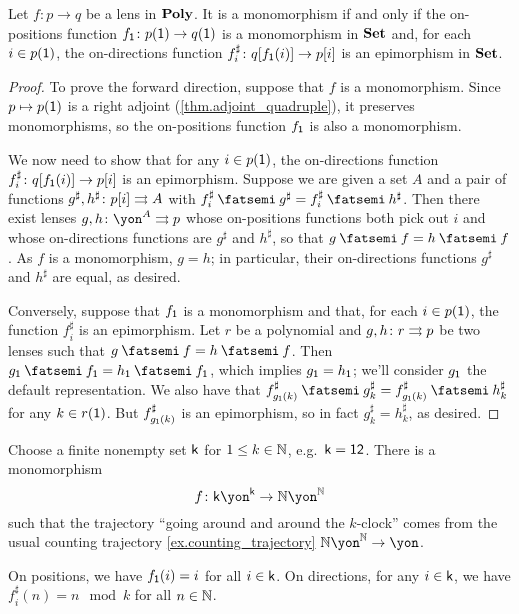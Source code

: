 \documentclass[Book-Poly]{subfiles}
\begin{document}
\begin{proposition}\label{prop.monics_in_poly}
Let $f \colon p \to q$ be a lens in $\mathbf{Poly}$. It is a monomorphism if and only if the on-positions function $f_{\textsf{1}} \colon p(\textsf{1}) \to q(\textsf{1})$ is a monomorphism in $\mathbf{Set}$ and, for each $i \in p(\textsf{1})$, the on-directions function $f^\sharp_i \colon q[f_{\textsf{1}}(i)]\to p[i]$ is an epimorphism in $\mathbf{Set}$.
\end{proposition}
\begin{proof}
To prove the forward direction, suppose that $f$ is a monomorphism.
Since $p\mapsto p(\textsf{1})$ is a right adjoint (\cref{thm.adjoint_quadruple}), it preserves monomorphisms, so the on-positions function $f_{\textsf{1}}$ is also a monomorphism.

We now need to show that for any $i\in p(\textsf{1})$, the on-directions function $f^\sharp_i \colon q[f_{\textsf{1}}(i)] \to p[i]$ is an epimorphism.
Suppose we are given a set $A$ and a pair of functions $g^\sharp,h^\sharp\colon p[i]\rightrightarrows A$ with $f^\sharp_i \then g^\sharp = f^\sharp_i \then h^\sharp$.
Then there exist lenses $g,h \colon \yon^A \tto p$ whose on-positions functions both pick out $i$ and whose on-directions functions are $g^\sharp$ and $h^\sharp$, so that $g \then f = h \then f$.
As $f$ is a monomorphism, $g = h$; in particular, their on-directions functions $g^\sharp$ and $h^\sharp$ are equal, as desired.

Conversely, suppose that $f_{\textsf{1}}$ is a monomorphism and that, for each $i\in p(\textsf{1})$, the function $f^\sharp_i$ is an epimorphism.
Let $r$ be a polynomial and $g,h\colon r\rightrightarrows p$ be two lenses such that $g \then f = h \then f$.
Then $g_\1 \then f_\1 = h_\1 \then f_\1$, which implies $g_{\textsf{1}} = h_{\textsf{1}}$; we'll consider $g_{\textsf{1}}$ the default representation.
We also have that $f^\sharp_{g_\1(k)} \then g^\sharp_k = f^\sharp_{g_\1(k)} \then h^\sharp_k$ for any $k \in r(\textsf{1})$. But $f^\sharp_{g_{\textsf{1}}(k)}$ is an epimorphism, so in fact $g^\sharp_k = h^\sharp_k$, as desired.
\end{proof}

\begin{example}\label{ex.clock_in_N}
Choose a finite nonempty set $\mathsf{k}$ for $1\leq k\in\mathbb{N}$, e.g.\ $\mathsf{k}=\textsf{1}\textsf{2}$. There is a monomorphism
\[
f \colon\ord{k}\yon^{\ord{k}}\to\nn\yon^\nn
\]
such that the trajectory ``going around and around the $k$-clock'' comes from the usual counting trajectory \cref{ex.counting_trajectory} $\nn\yon^\nn\to\yon$.

On positions, we have $f_{\textsf{1}}(i)=i$ for all $i \in \mathsf{k}$. On directions, for any $i \in \mathsf{k}$, we have $f^\sharp_i(n) = n \mod k$ for all $n \in \mathbb{N}$.
\end{example}
\end{document}
